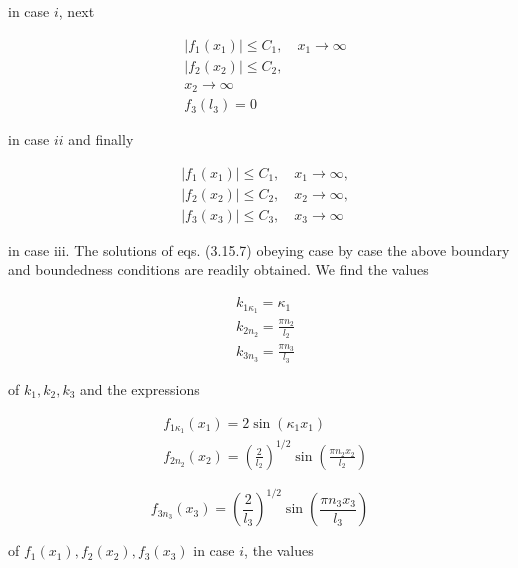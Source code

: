 \documentclass{article}
\begin{document}
in case $i$, next
 
\begin{align*}
& \left|f_{1}\left(x_{1}\right)\right| \leq C_{1}, \quad x_{1} \rightarrow \infty  \tag{3.15.44a}\\
& \left|f_{2}\left(x_{2}\right)\right| \leq C_{2},  \tag{3.15.44b}\\
& x_{2} \rightarrow \infty  \tag{3.15.44c}\\
& f_{3}\left(l_{3}\right)=0
\end{align*}
 
in case $i i$ and finally
 
\begin{align*}
& \left|f_{1}\left(x_{1}\right)\right| \leq C_{1}, \quad x_{1} \rightarrow \infty,  \tag{3.15.45a}\\
& \left|f_{2}\left(x_{2}\right)\right| \leq C_{2}, \quad x_{2} \rightarrow \infty,  \tag{3.15.45b}\\
& \left|f_{3}\left(x_{3}\right)\right| \leq C_{3}, \quad x_{3} \rightarrow \infty \tag{3.15.45c}
\end{align*}
 
in case iii. The solutions of eqs. (3.15.7) obeying case by case the above boundary and boundedness conditions are readily obtained. We find the values
 
\begin{align*}
& k_{1 \kappa_{1}}=\kappa_{1}  \tag{3.15.46a}\\
& k_{2 n_{2}}=\frac{\pi n_{2}}{l_{2}}  \tag{3.15.46b}\\
& k_{3 n_{3}}=\frac{\pi n_{3}}{l_{3}} \tag{3.15.46c}
\end{align*}
 
of $k_{1}, k_{2}, k_{3}$ and the expressions
 
\begin{align*}
& f_{1 \kappa_{1}}\left(x_{1}\right)=2 \sin \left(\kappa_{1} x_{1}\right)  \tag{3.15.47a}\\
& f_{2 n_{2}}\left(x_{2}\right)=\left(\frac{2}{l_{2}}\right)^{1 / 2} \sin \left(\frac{\pi n_{2} x_{2}}{l_{2}}\right) \tag{3.15.47b}
\end{align*}
 
 
\begin{equation*}
f_{3 n_{3}}\left(x_{3}\right)=\left(\frac{2}{l_{3}}\right)^{1 / 2} \sin \left(\frac{\pi n_{3} x_{3}}{l_{3}}\right) \tag{3.15.47c}
\end{equation*}
 
of $f_{1}\left(x_{1}\right), f_{2}\left(x_{2}\right), f_{3}\left(x_{3}\right)$ in case $i$, the values
 
\end{document}
